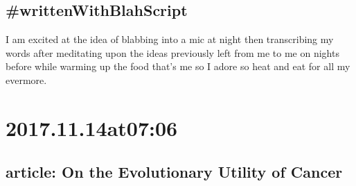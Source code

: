 \subsection*{\#writtenWithBlahScript }
I am excited at the idea of blabbing into a mic at night then transcribing my words after meditating upon the ideas previously left from me to me on nights before while warming up the food that's me so I adore so heat and eat for all my evermore.

\section*{ 2017.11.14at07:06 }
\subsection*{ article: On the Evolutionary Utility of Cancer }
